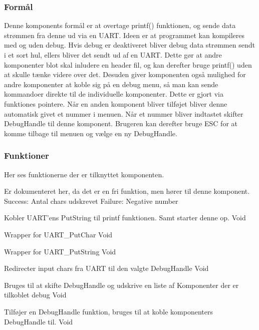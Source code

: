 \subsubsection{Formål}
Denne komponents formål er at overtage 
printf() funktionen, og sende data strømmen fra denne ud 
via en UART. Ideen er at programmet kan kompileres med 
og uden debug. Hvis debug er deaktiveret bliver debug 
data strømmen sendt i et sort hul, ellers bliver det 
sendt ud af en UART. Dette gør at andre komponenter 
blot skal inludere en header fil, og kan derefter bruge 
printf() uden at skulle tænke videre over det. Desuden giver 
komponenten også mulighed for andre komponenter at koble 
sig på en debug menu, så man kan sende kommandoer direkte 
til de individuelle komponenter. Dette er gjort via 
funktiones pointere. Når en anden komponent bliver tilføjet 
bliver denne automatisk givet et nummer i menuen. Når et 
nummer bliver indtastet skifter DebugHandle til denne 
komponent. Brugeren kan derefter bruge ESC for at komme 
tilbage til menuen og vælge en ny DebugHandle.


\subsubsection{Funktioner}
Her ses funktionerne der er tilknyttet komponenten.

{Er dokumenteret her, da det er en fri funktion, men hører til denne komponent.}
{Success: Antal chars udskrevet Failure: Negative number}
{
}

{Kobler UART'ens PutString til printf funktionen. Samt starter denne op.}
{Void}
{}

{Wrapper for UART\_PutChar}
{Void}
{
}

{Wrapper for UART\_PutString}
{Void}
{
}

{Redirecter input chars fra UART til den valgte DebugHandle}
{Void}
{}

{Bruges til at skifte DebugHandle og udskrive en liste af Komponenter der er tilkoblet debug}
{Void}
{}

{Tilføjer en DebugHandle funktion, bruges til at koble komponenters DebugHandle til.}
{Void}
{}
